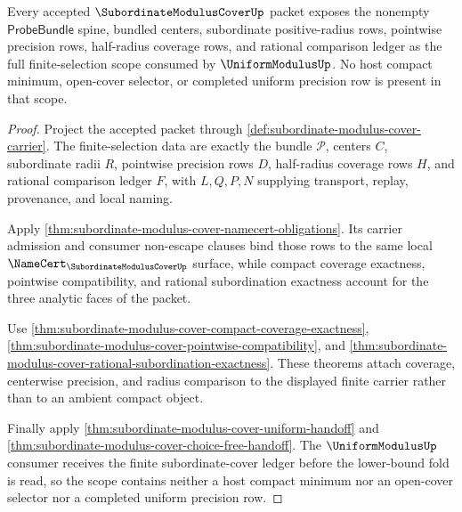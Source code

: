 \begin{theorem}
\label{thm:subordinate-modulus-cover-finite-selection-scope}
Every accepted $\SubordinateModulusCoverUp$ packet exposes the nonempty $\mathsf{ProbeBundle}$ spine, bundled centers, subordinate positive-radius rows, pointwise precision rows, half-radius coverage rows, and rational comparison ledger as the full finite-selection scope consumed by $\UniformModulusUp$. No host compact minimum, open-cover selector, or completed uniform precision row is present in that scope.
\end{theorem}
\begin{proof}
Project the accepted packet through \autoref{def:subordinate-modulus-cover-carrier}. The finite-selection data are exactly the bundle $\mathcal{P}$, centers $C$, subordinate radii $R$, pointwise precision rows $D$, half-radius coverage rows $H$, and rational comparison ledger $F$, with $L,Q,P,N$ supplying transport, replay, provenance, and local naming.

Apply \autoref{thm:subordinate-modulus-cover-namecert-obligations}. Its carrier admission and consumer non-escape clauses bind those rows to the same local $\NameCert_{\SubordinateModulusCoverUp}$ surface, while compact coverage exactness, pointwise compatibility, and rational subordination exactness account for the three analytic faces of the packet.

Use \autoref{thm:subordinate-modulus-cover-compact-coverage-exactness}, \autoref{thm:subordinate-modulus-cover-pointwise-compatibility}, and \autoref{thm:subordinate-modulus-cover-rational-subordination-exactness}. These theorems attach coverage, centerwise precision, and radius comparison to the displayed finite carrier rather than to an ambient compact object.

Finally apply \autoref{thm:subordinate-modulus-cover-uniform-handoff} and \autoref{thm:subordinate-modulus-cover-choice-free-handoff}. The $\UniformModulusUp$ consumer receives the finite subordinate-cover ledger before the lower-bound fold is read, so the scope contains neither a host compact minimum nor an open-cover selector nor a completed uniform precision row.
\end{proof}

